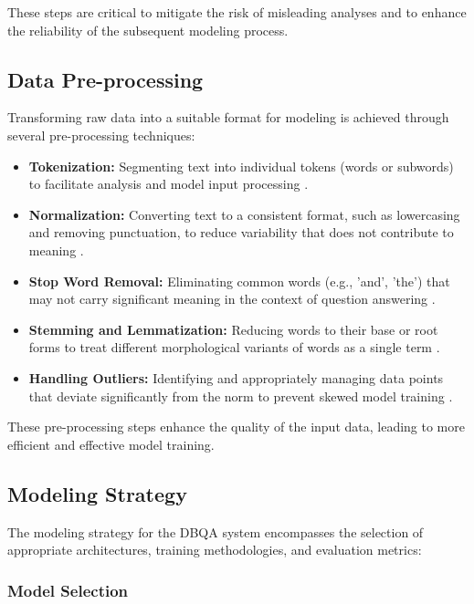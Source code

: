 \documentclass[sigconf]{acmart}
\begin{document}
These steps are critical to mitigate the risk of misleading analyses and to enhance the reliability of the subsequent modeling process.

\subsection{Data Pre-processing}

Transforming raw data into a suitable format for modeling is achieved through several pre-processing techniques:

\begin{itemize}
    \item \textbf{Tokenization:} Segmenting text into individual tokens (words or subwords) to facilitate analysis and model input processing \cite{turn0search0}.
    \item \textbf{Normalization:} Converting text to a consistent format, such as lowercasing and removing punctuation, to reduce variability that does not contribute to meaning \cite{turn0search0}.
    \item \textbf{Stop Word Removal:} Eliminating common words (e.g., 'and', 'the') that may not carry significant meaning in the context of question answering \cite{turn0search0}.
    \item \textbf{Stemming and Lemmatization:} Reducing words to their base or root forms to treat different morphological variants of words as a single term \cite{turn0search0}.
    \item \textbf{Handling Outliers:} Identifying and appropriately managing data points that deviate significantly from the norm to prevent skewed model training \cite{turn0search6}.
\end{itemize}

These pre-processing steps enhance the quality of the input data, leading to more efficient and effective model training.

\subsection{Modeling Strategy}

The modeling strategy for the DBQA system encompasses the selection of appropriate architectures, training methodologies, and evaluation metrics:

\subsubsection{Model Selection}
\end{document}
